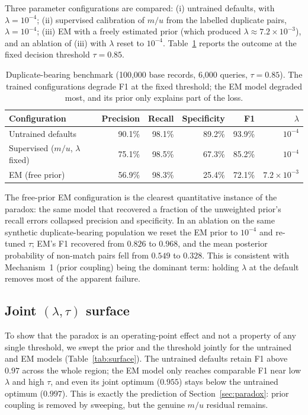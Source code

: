 \documentclass[conference]{IEEEtran}
\begin{document}
Three parameter configurations are compared: (i) untrained defaults, with $\lambda=10^{-4}$;
(ii) supervised calibration of $m/u$ from the labelled duplicate pairs, $\lambda=10^{-4}$;
(iii) EM with a freely estimated prior (which produced $\lambda\approx7.2\times10^{-3}$),
and an ablation of (iii) with $\lambda$ reset to $10^{-4}$. Table~\ref{tab:benchmark}
reports the outcome at the fixed decision threshold $\tau=0.85$.

\begin{table}[t]
\centering
\caption{Duplicate-bearing benchmark (100{,}000 base records, 6{,}000 queries,
$\tau=0.85$). The trained configurations degrade F1 at the fixed threshold; the EM model
degraded most, and its prior only explains part of the loss.}
\label{tab:benchmark}
\begin{tabular}{lrrrrr}
\toprule
Configuration & Precision & Recall & Specificity & F1 & $\lambda$\\
\midrule
Untrained defaults & 90.1\% & 98.1\% & 89.2\% & 93.9\% & $10^{-4}$\\
Supervised ($m/u$, $\lambda$ fixed) & 75.1\% & 98.5\% & 67.3\% & 85.2\% & $10^{-4}$\\
EM (free prior) & 56.9\% & 98.3\% & 25.4\% & 72.1\% & $7.2\times10^{-3}$\\
\bottomrule
\end{tabular}
\end{table}

The free-prior EM configuration is the clearest quantitative instance of the paradox: the
same model that recovered a fraction of the unweighted prior's recall errors collapsed
precision and specificity. In an ablation on the same synthetic duplicate-bearing population
we reset the EM prior to $10^{-4}$ and re-tuned $\tau$; EM's F1 recovered from $0.826$ to
$0.968$, and the mean posterior probability of non-match pairs fell from $0.549$ to
$0.328$. This is consistent with Mechanism~1 (prior coupling) being the dominant term:
holding $\lambda$ at the default removes most of the apparent failure.

\subsection{Joint $(\lambda,\tau)$ surface}
To show that the paradox is an operating-point effect and not a property of any single
threshold, we swept the prior and the threshold jointly for the untrained and EM models
(Table~\ref{tab:surface}). The untrained defaults retain F1 above $0.97$ across the whole
region; the EM model only reaches comparable F1 near low $\lambda$ and high $\tau$, and even
its joint optimum ($0.955$) stays below the untrained optimum ($0.997$). This is exactly the
prediction of Section~\ref{sec:paradox}: prior coupling is removed by sweeping, but the
genuine $m/u$ residual remains.
\end{document}
